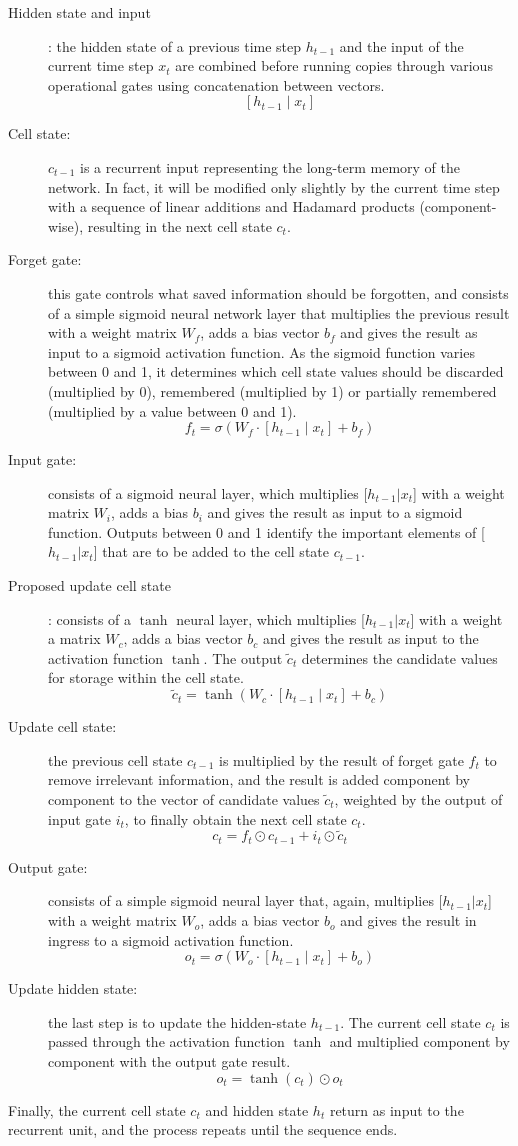 \begin{description}
	\item[Hidden state and input]: the hidden state of a previous time step $h_{t-1}$ and the input of the current time step $x_t$ are combined before running copies through various operational gates using concatenation between vectors.
	$$
	\left[h_{t-1} \mid x_{t}\right]
	$$
	\item[Cell state:] $c_{t-1}$ is a recurrent input representing the long-term memory of the network. In fact, it will be modified only slightly by the current time step with a sequence of linear additions and Hadamard products (component-wise), resulting in the next cell state $c_t$.
	\item[Forget gate:] this gate controls what saved information should be forgotten, and consists of a simple sigmoid neural network layer that multiplies the previous result with a weight matrix $W_f$, adds a bias vector $b_f$ and gives the result as input to a sigmoid activation function. As the sigmoid function varies between 0 and 1, it determines which cell state values should be discarded (multiplied by 0), remembered (multiplied by 1) or partially remembered (multiplied by a value between 0 and 1).
	$$
	f_{t}=\sigma\left(W_{f} \cdot\left[h_{t-1} \mid x_{t}\right]+b_{f}\right)
	$$
	\item[Input gate:] consists of a sigmoid neural layer, which multiplies [$h_{t-1} | x_t$] with a weight matrix $W_i$, adds a bias $b_i$ and gives the result as input to a sigmoid function. Outputs between 0 and 1 identify the important elements of [$h_{t-1} | x_t$] that are to be added to the cell state $c_{t-1}$.
	\item[Proposed update cell state]: consists of a $\tanh$ neural layer, which multiplies [$h_{t-1} | x_t$] with a weight a matrix $W_c$, adds a bias vector $b_c$ and gives the result as input to the activation function $\tanh$. The output $\tilde{c}_t$ determines the candidate values for storage within the cell state.
	$$
	\tilde{c}_{t}=\tanh \left(W_{c} \cdot\left[h_{t-1} \mid x_{t}\right]+b_{c}\right)
	$$
	\item[Update cell state:] the previous cell state $c_{t-1}$ is multiplied by the result of forget gate $f_t$ to remove irrelevant information, and the result is added component by component to the vector of candidate values $\tilde{c}_{t}$, weighted by the output of input gate $i_t$, to finally obtain the next cell state $c_t$.
	$$
	c_{t}=f_{t} \odot c_{t-1}+i_{t} \odot \tilde{c}_{t}
	$$
	\item[Output gate:] consists of a simple sigmoid neural layer that, again, multiplies [$h_{t-1} | x_t$] with a weight matrix $W_o$, adds a bias vector $b_o$ and gives the result in ingress to a sigmoid activation function.
	$$
	o_{t}=\sigma\left(W_{o} \cdot\left[h_{t-1} \mid x_{t}\right]+b_{o}\right)
	$$
	\item[Update hidden state:] the last step is to update the hidden-state $h_{t-1}$.  The current cell state $c_t$ is passed through the activation function $\tanh$ and multiplied component by component with the output gate result.
	$$
	o_{t}=\tanh \left(c_{t}\right) \odot o_{t}
	$$
\end{description}
Finally, the current cell state $c_t$ and hidden state $h_t$ return as input to the recurrent unit, and the process repeats until the sequence ends.